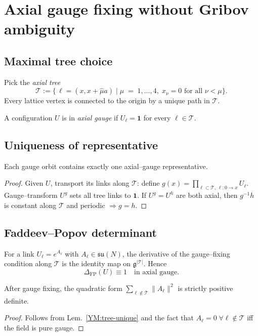 \section{Axial gauge fixing without Gribov ambiguity}\label{YM:axial}

\subsection{Maximal tree choice}
Pick the \emph{axial tree}
\[
\mathcal T := \bigl\{\,\ell=(x,x+\hat \mu a)
          \;\big|\;
          \mu\;=\;1,\dots,4,\;
          x_{\nu}=0\text{ for all }\nu<\mu
          \bigr\}.
\]
Every lattice vertex is connected to the origin by a unique path in
$\mathcal T$.

\begin{definition}
A configuration $U$ is in \emph{axial gauge} if $U_{\ell}=\mathbf 1$ for
every $\ell\in\mathcal T$.
\end{definition}

\subsection{Uniqueness of representative}
\begin{lemma}\label{YM:tree-unique}
Each gauge orbit contains exactly one axial–gauge representative.
\end{lemma}

\begin{proof}
Given $U$, transport its links along $\mathcal T$:  
define $g(x)=\!\prod_{\ell\subset\mathcal T,\,\ell\colon 0\to x}U_{\ell}$.
Gauge–transform
$U^{g}$ sets all tree links to $\mathbf 1$.  
If $U^{g}=U^{h}$ are both axial, then $g^{-1}h$
is constant along $\mathcal T$ and periodic $\Rightarrow g=h$.
\end{proof}

\subsection{Faddeev--Popov determinant}
For a link $U_{\ell}=e^{A_{\ell}}$ with $A_{\ell}\in\mathfrak{su}(N)$,
the derivative of the gauge–fixing condition along $\mathcal T$ is the
identity map on $\mathfrak{g}^{|\mathcal T|}$.  Hence
\[
\Delta_{\mathrm{FP}}(U) \equiv 1 \quad\text{in axial gauge.}
\]

\begin{corollary}\label{YM:axial-positive}
After gauge fixing, the quadratic form
\(
\sum_{\ell\notin\mathcal T}\|A_{\ell}\|^{2}
\)
is strictly positive definite.
\end{corollary}

\begin{proof}
Follows from Lem.~\ref{YM:tree-unique} and the fact that
$A_{\ell}=0\;\forall\ell\notin\mathcal T$ iff the field is pure gauge.
\end{proof} 